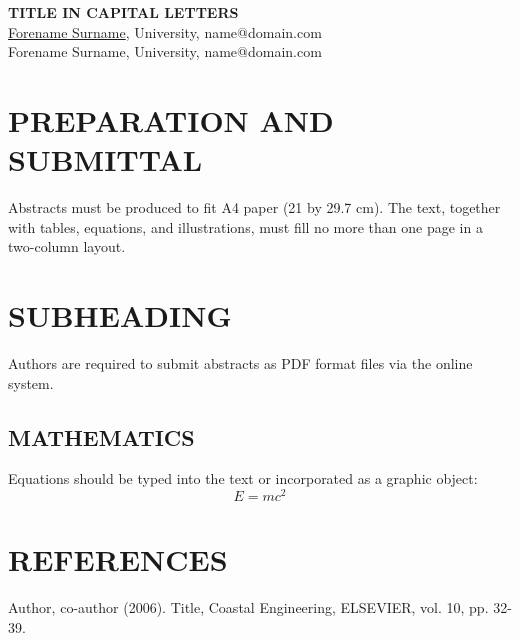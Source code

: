 \documentclass[a4paper]{article}
\begin{document}
\thispagestyle{empty}  %

\begin{center}
    \fontsize{12pt}{14pt}\selectfont
    \textbf{TITLE IN CAPITAL LETTERS} \\[1em]
    \fontsize{9pt}{11pt}\selectfont
    \underline{Forename Surname}, University, name@domain.com \\
    Forename Surname, University, name@domain.com
\end{center}

\begin{multicols}{2}
\fontsize{9pt}{11pt}\selectfont

\section*{PREPARATION AND SUBMITTAL}
Abstracts must be produced to fit A4 paper (21 by 29.7 cm). The text, together with tables, equations, and illustrations, must fill no more than one page in a two-column layout.

\section*{SUBHEADING}
Authors are required to submit abstracts as PDF format files via the online system.

\subsection*{MATHEMATICS}
Equations should be typed into the text or incorporated as a graphic object:
\begin{equation}
    E = mc^2
\end{equation}

\section*{REFERENCES}
Author, co-author (2006). Title, Coastal Engineering, ELSEVIER, vol. 10, pp. 32-39.

\end{multicols}
\end{document}
